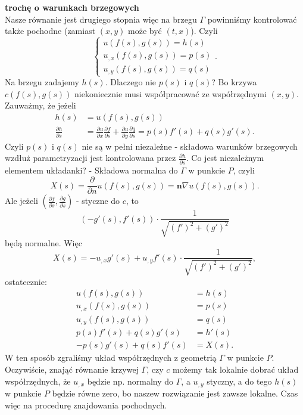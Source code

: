 \documentclass[../main.tex]{subfiles}
\begin{document}
		\textbf{trochę o warunkach brzegowych}\\
		Nasze równanie jest drugiego stopnia więc na brzegu $\Gamma$
 powinniśmy kontrolować także pochodne (zamiast $(x,y)$ może być $(t,x)$). Czyli
 \[
 \begin{cases}
		 u(f(s), g(s))=h(s)\\
		 u_{,x}(f(s),g(s)) = p(s)\\
		 u_{,y}(f(s),g(s)) = q(s)
 \end{cases}
 .\]
 Na brzegu zadajemy $h(s)$. Dlaczego nie $p(s)$ i $q(s)$? Bo krzywa $c(f(s),g(s))$ niekoniecznie musi współpracować ze współrzędnymi $(x,y).$\\
 Zauważmy, że jeżeli
 \begin{align*}
		 h(s) &= u(f(s), g(s))\\
		 \frac{\partial h}{\partial s} &= \frac{\partial u}{\partial x} \frac{\partial f}{\partial s} + \frac{\partial u}{\partial y} \frac{\partial q}{\partial s} = p(s)f'(s) + q(s)g'(s)
 .\end{align*}
 Czyli $p(s)$ i $q(s)$ nie są w pełni niezależne - składowa warunków brzegowych wzdłuż parametryzacji jest kontrolowana przez $\frac{\partial h}{\partial s} $. Co jest niezależnym elementem układanki? - Składowa normalna do $\Gamma$ w punkcie $P$, czyli
 \[
		 X(s) = \frac{\partial }{\partial n} u(f(s),g(s)) = \mathbf{n} \nabla u(f(s), g(s))
 .\]
 Ale jeżeli $\left( \frac{\partial f}{\partial s} , \frac{\partial g}{\partial s}  \right) $ - styczne do $c$, to
 \[
		 \left( -g'(s), f'(s) \right) \cdot \frac{1}{\sqrt{\left( f' \right) ^2 + \left( g' \right) ^2} }
 \]
 będą normalne. Więc
 \[
		 X(s) = -u_{,x}g'(s) + u_{,y}f'(s) \cdot \frac{1}{\sqrt{\left( f' \right) ^2 + \left( g' \right) ^2} }
 ,\]
 ostatecznie:
\begin{align*}
		u(f(s), g(s)) &= h(s)\\
		u_{,x}(f(s), g(s)) &= p(s)\\
		u_{,y}(f(s), g(s)) &= q(s)\\
		p(s)f'(s) + q(s)g'(s) &= h'(s)\\
		-p(s)g'(s) + q(s)f'(s) &= X(s)
.\end{align*}
W ten sposób zgraliśmy układ współrzędnych z geometrią $\Gamma$ w punkcie $P$. Oczywiście, znająć równanie krzywej $\Gamma$, czy $c$ możemy tak lokalnie dobrać układ współrzędnych, że $u_{,x}$ będzie np. normalny do $\Gamma$, a $u_{,y}$ styczny, a do tego $h(s)$ w punkcie $P$ będzie równe zero, bo naszew rozwiązanie jest zawsze lokalne. Czas więc na procedurę znajdowania pochodnych.\\
\end{document}
